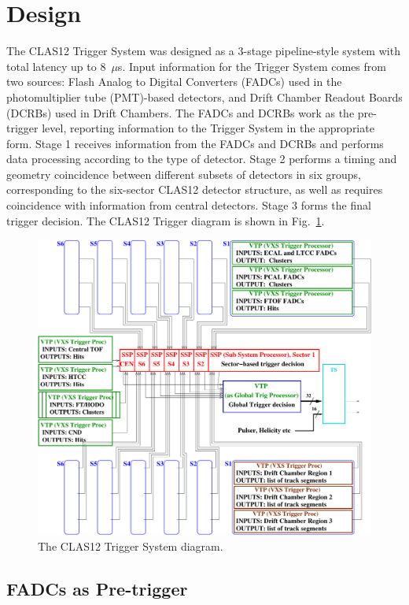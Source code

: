 \section{Design}

The CLAS12 Trigger System was designed as a 3-stage pipeline-style system with total latency up to 8~$\mu$s. Input information for the Trigger System comes from two sources:  Flash Analog to Digital Converters (FADCs) used in the photomultiplier tube (PMT)-based detectors, and Drift Chamber Readout Boards (DCRBs) used in Drift Chambers. The FADCs and DCRBs work as the pre-trigger level, reporting information to the Trigger System in the appropriate form. Stage 1 receives information from the FADCs and DCRBs and performs data processing according to the type of detector. Stage 2 performs a timing and geometry coincidence between different subsets of detectors in six groups, corresponding to the six-sector CLAS12 detector structure, as well as requires coincidence with information from central detectors. Stage 3 forms the final trigger decision. The CLAS12 Trigger diagram is shown in Fig.~\ref{fig:TriggerDiagram}.

\begin{figure}[hbt]
	\centering
	\includegraphics[width=1.0\columnwidth,keepaspectratio]{img/CLAS12_TRIGGER_1.pdf}
	\caption{The CLAS12 Trigger System diagram.}
	\label{fig:TriggerDiagram}
\end{figure}


\subsection{FADCs as Pre-trigger}

